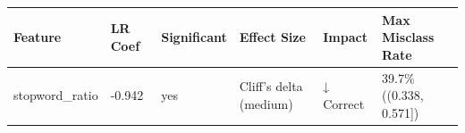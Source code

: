 \begin{tabular}{llllll}
\toprule
Feature & LR Coef & Significant & Effect Size & Impact & Max Misclass Rate \\
\midrule
stopword\_ratio & -0.942 & yes & Cliff's delta (medium) & ↓ Correct & 39.7\% ((0.338, 0.571]) \\
\bottomrule
\end{tabular}
